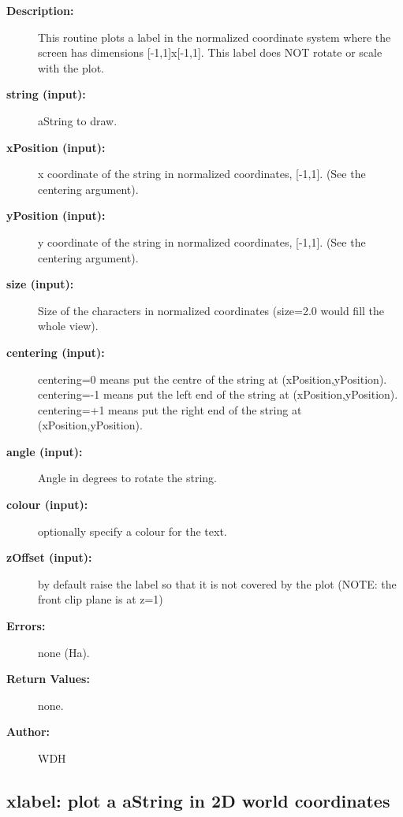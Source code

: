 \begin{description}
\item[{\bf Description:}] 
    This routine plots a label in the normalized coordinate system where the screen
    has dimensions [-1,1]x[-1,1]. This label does NOT rotate or scale with the plot.
\item[{\bf string (input):}]  aString to draw.
\item[{\bf xPosition (input):}]  x coordinate of the string in normalized coordinates, [-1,1]. (See the
    centering argument).
\item[{\bf yPosition (input):}]  y coordinate of the string in normalized coordinates, [-1,1]. (See the
    centering argument).
\item[{\bf size (input):}]  Size of the characters in normalized coordinates (size=2.0 would fill the whole view).
\item[{\bf centering (input):}]  {\ff centering=0} means put the centre of the string at {\ff (xPosition,yPosition)}.
    {\ff centering=-1} means put the left end of the string at {\ff (xPosition,yPosition)}.
    {\ff centering=+1} means put the right end of the string at {\ff (xPosition,yPosition)}.
\item[{\bf angle (input):}]  Angle in degrees to rotate the string.
\item[{\bf colour (input):}]  optionally specify a colour for the text. 
\item[{\bf zOffset (input):}]  by default raise the label so that it is not covered by the plot 
                (NOTE: the front clip plane is at z=1)
\item[{\bf Errors:}]  none (Ha).
\item[{\bf Return Values:}]  none.
  
\item[{\bf Author:}]  WDH
\end{description}
\subsection{xlabel: plot a aString in 2D world coordinates}
 
